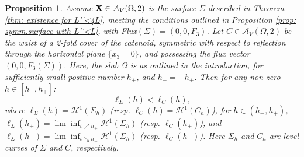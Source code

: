 \documentclass[11pt]{amsart}
\numberwithin{equation}{section}
\theoremstyle{theorem}
\newtheorem{proposition}[theorem]{Proposition}
\theoremstyle{definition}
\numberwithin{equation}{section}
\begin{document}
\begin{proposition} \label{prop: length comparison in A(omega,2)}
     Assume $\bold{X} \in \mathcal{A}_V(\Omega ,2)$ is the surface $\Sigma$ described in Theorem \ref{thm: existence for L''<4L}, meeting the conditions outlined in Proposition \ref{prop: symm.surface with L''<L}, with Flux$(\Sigma)=(0,0,F_3)$. Let $C \in \mathcal{A}_V(\Omega ,2)$ be the waist of a 2-fold cover of the catenoid, symmetric with respect to reflection through the horizontal plane $\{ x_3=0\}$, and possessing the flux vector $(0,0,F_3(\Sigma))$. Here, the slab $\Omega$ is as outlined in the introduction, for sufficiently small positive number $h_+$, and $h_-=-h_+$. Then for any non-zero $h\in [h_-,h_+]$: 
     $$\ell_{\Sigma}(h)<\ell_{C}(h),$$
     where $\ell_{\Sigma}(h)=\mathcal{H}^1(\Sigma_h)$ (resp. $\ell_C(h)=\mathcal{H}^1(C_h)$), for $h\in (h_-,h_+)$, \\ $\ell_{\Sigma}(h_+)=\lim \inf_{t\nearrow h_+}  \mathcal{H}^1(\Sigma_h)$ (resp.  $\ell_{C}(h_+)$), and $\ell_{\Sigma}(h_-)=\lim \inf_{t\searrow h_-}  \mathcal{H}^1(\Sigma_h)$ (resp.  $\ell_{C}(h_-)$). Here $\Sigma_h$ and $C_h$ are level curves of $\Sigma$ and $C$, respectively.
\end{proposition}
\end{document}
